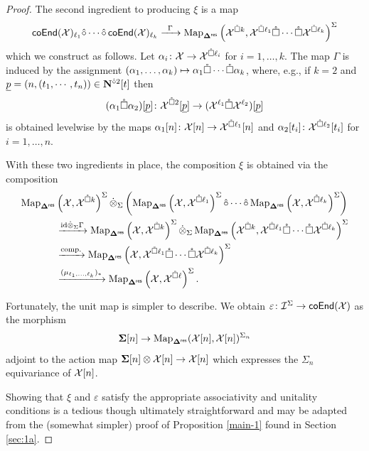 \begin{proof}
    The second ingredient to producing $\xi$ is a map \begin{equation} \label{eq:def-Gamma}
        \mathsf{coEnd}(\mathcal{X})_{\ell_1} \hat{\circ} \cdots \hat{\circ} \, \mathsf{coEnd}(\mathcal{X})_{\ell_k} \xrightarrow{\;\;\Gamma\;\;} \operatorname{Map}_{\mathbf{\Delta}^{\mathsf{res}}} \left(\mathcal{X}^{\mathring{\square} k}, \mathcal{X}^{\mathring{\square} \ell_1} \mathring{\square} \cdots \mathring{\square} \mathcal{X}^{\mathring{\square} \ell_k} \right)^{\Sigma}
    \end{equation}
    which we construct as follows. Let $\alpha_i\colon \mathcal{X}\to \mathcal{X}^{\mathring{\square} \ell_i}$ for $i=1,\dots, k$. The map $\Gamma$ is induced by the assignment $(\alpha_1,\dots,\alpha_k)\mapsto \alpha_1 \mathring{\square} \cdots \mathring{\square} \alpha_k$,  where, e.g.,  if $k=2$ and $\underline{p}=(n,(t_1,\cdots,t_n))\in \mathbf{N}^{\hat{\circ}2}[t]$ then \[(\alpha_1\mathring{\square} \alpha_2)[\underline{p}] \colon \mathcal{X}^{\mathring{\square} 2}[\underline{p}] \to (\mathcal{X}^{\ell_1} \mathring{\square} \mathcal{X}^{\ell_2})[\underline{p}]\] is obtained levelwise by the maps $\alpha_1[n] \colon \mathcal{X}[n]\to \mathcal{X}^{\mathring{\square} \ell_1}[n]$ and $\alpha_2[t_i]\colon \mathcal{X}^{\mathring{\square} \ell_2}[t_i]$ for $i=1,\dots,n$.

   With these two ingredients in place, the composition $\xi$ is obtained via the composition \begin{align*} 
            \operatorname{Map}_{\mathbf{\Delta}^{\mathsf{res}}}&\left(\mathcal{X},\mathcal{X}^{\mathring{\square} k}\right)^{\Sigma} \dot{\otimes}_{\Sigma}\left( \operatorname{Map}_{\mathbf{\Delta}^{\mathsf{res}}}\left(\mathcal{X},\mathcal{X}^{\mathring{\square} \ell_1}\right)^{\Sigma}  \hat{\circ} \cdots \hat{\circ} \operatorname{Map}_{\mathbf{\Delta}^{\mathsf{res}}}\left(\mathcal{X},\mathcal{X}^{\mathring{\square} \ell_k}\right)^{\Sigma} \right)
            \\
            &\xrightarrow{\mathrm{id} \dot{\otimes}_{\Sigma}  \Gamma}  
            \operatorname{Map}_{\mathbf{\Delta}^{\mathsf{res}}} \left(\mathcal{X},\mathcal{X}^{\mathring{\square} k}\right)^{\Sigma} \dot{\otimes}_{\Sigma}  \operatorname{Map}_{\mathbf{\Delta}^{\mathsf{res}}} \left(\mathcal{X}^{\mathring{\square} k},  \mathcal{X}^{\mathring{\square} \ell_1} \mathring{\square} \cdots \mathring{\square} \mathcal{X}^{\mathring{\square} \ell_k} \right)^{\Sigma} 
            \\
            &\xrightarrow{\text{comp.}} 
            \operatorname{Map}_{\mathbf{\Delta}^{\mathsf{res}}} \left(\mathcal{X}, \mathcal{X}^{\mathring{\square} \ell_1} \mathring{\square} \cdots \mathring{\square} \mathcal{X}^{\mathring{\square} \ell_k}\right)^{\Sigma} \\
            &\xrightarrow{(\mu_{\ell_1,\dots,\ell_k})_*}
            \operatorname{Map}_{\mathbf{\Delta}^{\mathsf{res}}}\left(\mathcal{X},\mathcal{X}^{\mathring{\square} \ell}\right)^{\Sigma}.
        \end{align*}
    
    Fortunately, the unit map is simpler to describe. We obtain $\varepsilon\colon \mathcal{I}^{\Sigma}\to \mathsf{coEnd}(\mathcal{X})$ as the morphism \[\mathbf{\Sigma}[n]\to \operatorname{Map}_{\mathbf{\Delta}^{\mathsf{res}}}(\mathcal{X}[n], \mathcal{X}[n])^{\Sigma_n}\]  adjoint to the action map $\mathbf{\Sigma}[n] \otimes \mathcal{X}[n] \to \mathcal{X}[n]$ which expresses the $\Sigma_n$ equivariance of $\mathcal{X}[n]$. 
    
    Showing that $\xi$ and $\varepsilon$ satisfy the appropriate associativity and unitality conditions is a tedious though ultimately straightforward and may be adapted from the (somewhat simpler) proof of Proposition \ref{main-1} found in Section \ref{sec:1a}. 
\end{proof}


